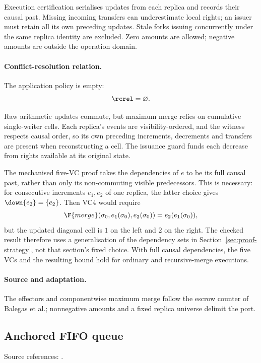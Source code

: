 Execution certification serialises updates from each replica and records their causal past. Missing incoming transfers can underestimate local rights; an issuer must retain all its own preceding updates. Stale forks issuing concurrently under the same replica identity are excluded. Zero amounts are allowed; negative amounts are outside the operation domain.


\paragraph{Conflict-resolution relation.}
The application policy is empty:
\[
\rcrel=\varnothing.
\]

Raw arithmetic updates commute, but maximum merge relies on cumulative
single-writer cells. Each replica's events are visibility-ordered, and the
witness respects causal order, so its own preceding increments, decrements
and transfers are present when reconstructing a cell. The issuance guard
funds each decrease from rights available at its original state.

The mechanised five-VC proof takes the dependencies of $e$ to be its full
causal past, rather than only its non-commuting visible predecessors. This
is necessary: for consecutive increments $e_1,e_2$ of one replica, the
latter choice gives $\down{e_2}=\{e_2\}$. Then VC4 would require
\[
\F{merge}(\sigma_0,e_1(\sigma_0),e_2(\sigma_0))
=e_2(e_1(\sigma_0)),
\]
but the updated diagonal cell is $1$ on the left and $2$ on the right.
The checked result therefore uses a generalisation of the dependency sets
in Section~\ref{sec:proof-strategy}, not that section's fixed choice.
With full causal dependencies, the five VCs and the resulting bound hold
for ordinary and recursive-merge executions.

\paragraph{Source and adaptation.}
The effectors and componentwise maximum merge follow the escrow counter of Balegas et al.; nonnegative amounts and a fixed replica universe delimit the port.


\subsection{Anchored FIFO queue}
\label{app:dt-anchored-queue-paper-variant}

\noindent Source references: \cite{Roh,Vimala}.

